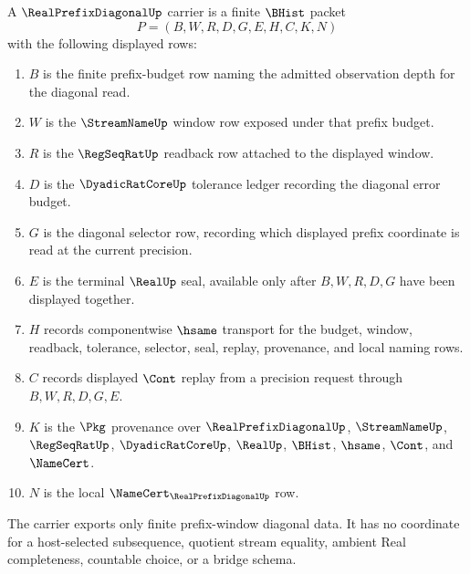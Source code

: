 \begin{definition}
\label{def:real-prefix-diagonal-carrier}
A $\RealPrefixDiagonalUp$ carrier is a finite $\BHist$ packet
$$
P=(B,W,R,D,G,E,H,C,K,N)
$$
with the following displayed rows:
\begin{enumerate}
\item $B$ is the finite prefix-budget row naming the admitted observation depth for the diagonal read.
\item $W$ is the $\StreamNameUp$ window row exposed under that prefix budget.
\item $R$ is the $\RegSeqRatUp$ readback row attached to the displayed window.
\item $D$ is the $\DyadicRatCoreUp$ tolerance ledger recording the diagonal error budget.
\item $G$ is the diagonal selector row, recording which displayed prefix coordinate is read at the current precision.
\item $E$ is the terminal $\RealUp$ seal, available only after $B,W,R,D,G$ have been displayed together.
\item $H$ records componentwise $\hsame$ transport for the budget, window, readback, tolerance, selector, seal, replay, provenance, and local naming rows.
\item $C$ records displayed $\Cont$ replay from a precision request through $B,W,R,D,G,E$.
\item $K$ is the $\Pkg$ provenance over $\RealPrefixDiagonalUp$, $\StreamNameUp$, $\RegSeqRatUp$, $\DyadicRatCoreUp$, $\RealUp$, $\BHist$, $\hsame$, $\Cont$, and $\NameCert$.
\item $N$ is the local $\NameCert_{\RealPrefixDiagonalUp}$ row.
\end{enumerate}
The carrier exports only finite prefix-window diagonal data. It has no coordinate for a host-selected subsequence, quotient stream equality, ambient Real completeness, countable choice, or a bridge schema.
\end{definition}

